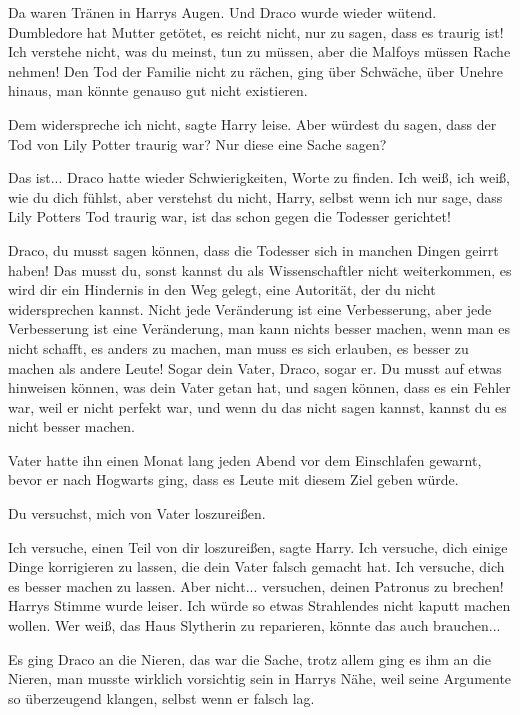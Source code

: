 Da waren Tränen in Harrys Augen. Und Draco wurde wieder wütend. \glqq Dumbledore
hat Mutter getötet, es reicht nicht, nur zu sagen, dass es traurig ist! Ich
verstehe nicht, was du meinst, tun zu müssen, aber die Malfoys müssen Rache
nehmen!\grqq{} Den Tod der Familie nicht zu rächen, ging über Schwäche, über
Unehre hinaus, man könnte genauso gut nicht existieren.

\glqq Dem widerspreche ich nicht\grqq{}, sagte Harry leise. \glqq Aber würdest
du sagen, dass der Tod von Lily Potter traurig war? Nur diese eine Sache
sagen?\grqq{}

\glqq Das ist...\grqq{} Draco hatte wieder Schwierigkeiten, Worte zu finden.
\glqq Ich weiß, ich weiß, wie du dich fühlst, aber verstehst du nicht, Harry,
selbst wenn ich nur sage, dass Lily Potters Tod traurig war, ist das schon gegen
die Todesser gerichtet!\grqq{}

\glqq Draco, du musst sagen können, dass die Todesser sich in manchen Dingen
geirrt haben! Das musst du, sonst kannst du als Wissenschaftler nicht
weiterkommen, es wird dir ein Hindernis in den Weg gelegt, eine Autorität, der
du nicht widersprechen kannst. Nicht jede Veränderung ist eine Verbesserung,
aber jede Verbesserung ist eine Veränderung, man kann nichts besser machen, wenn
man es nicht schafft, es anders zu machen, man muss es sich erlauben, es besser
zu machen als andere Leute! Sogar dein Vater, Draco, sogar er. Du musst auf
etwas hinweisen können, was dein Vater getan hat, und sagen können, dass es ein
Fehler war, weil er nicht perfekt war, und wenn du das nicht sagen kannst,
kannst du es nicht besser machen.\grqq{}

Vater hatte ihn einen Monat lang jeden Abend vor dem Einschlafen gewarnt, bevor
er nach Hogwarts ging, dass es Leute mit diesem Ziel geben würde.

\glqq Du versuchst, mich von Vater loszureißen.\grqq{}

\glqq Ich versuche, einen Teil von dir loszureißen\grqq{}, sagte Harry. \glqq
Ich versuche, dich einige Dinge korrigieren zu lassen, die dein Vater falsch
gemacht hat. Ich versuche, dich es besser machen zu lassen. Aber nicht...
versuchen, deinen Patronus zu brechen!\grqq{} Harrys Stimme wurde leiser. \glqq
Ich würde so etwas Strahlendes nicht kaputt machen wollen. Wer weiß, das Haus
Slytherin zu reparieren, könnte das auch brauchen...\grqq{}

Es ging Draco an die Nieren, das war die Sache, trotz allem ging es ihm an die
Nieren, man musste wirklich vorsichtig sein in Harrys Nähe, weil seine Argumente
so überzeugend klangen, selbst wenn er falsch lag.

